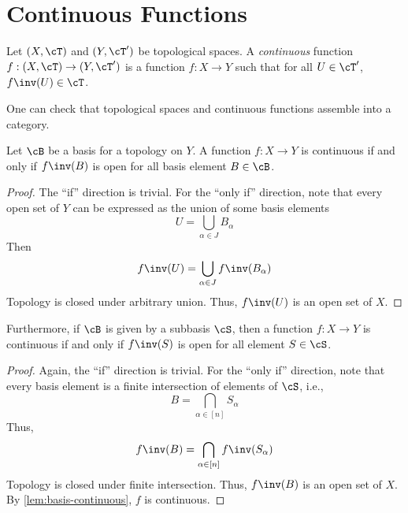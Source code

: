 \documentclass{amsart}
\begin{document}
\section{Continuous Functions}
\label{sec:continuous-functions}

\begin{defn}
  Let $(X,\cT)$ and $(Y,\cT')$ be topological spaces.
  A \emph{continuous} function $f : (X,\cT) \to (Y,\cT')$ is a function $f : X \to Y$ such that for all $U \in \cT'$, $f\inv(U) \in \cT$.
\end{defn}
One can check that topological spaces and continuous functions assemble into a category.

\begin{lem}\label{lem:basis-continuous}
  Let $\cB$ be a basis for a topology on $Y$.
  A function $f : X \to Y$ is continuous if and only if $f\inv(B)$ is open for all basis element $B \in \cB$.
\end{lem}
\begin{proof}
  The ``if'' direction is trivial.
  For the ``only if'' direction, note that every open set of $Y$ can be expressed as the union of some basis elements
  \[
    U = \bigcup_{\alpha \in J}B_{\alpha}
  \]
  Then
  \[
    f\inv(U) = \bigcup_{\alpha \in J} f\inv(B_{\alpha})
  \]
  Topology is closed under arbitrary union.
  Thus, $f\inv(U)$ is an open set of $X$.
\end{proof}

\begin{lem}
  Furthermore, if $\cB$ is given by a subbasis $\cS$, then a function $f : X \to Y$ is continuous if and only if $f\inv(S)$ is open for all element $S \in \cS$.
\end{lem}
\begin{proof}
  Again, the ``if'' direction is trivial.
  For the ``only if'' direction, note that every basis element is a finite intersection of elements of $\cS$, i.e.,
  \[
    B = \bigcap_{\alpha \in [n]} S_{\alpha}
  \]
  Thus,
  \[
    f\inv(B) = \bigcap_{\alpha \in [n]}f\inv(S_{\alpha})
  \]
  Topology is closed under finite intersection.
  Thus, $f\inv(B)$ is an open set of $X$.
  By \cref{lem:basis-continuous}, $f$ is continuous.
\end{proof}
\end{document}
